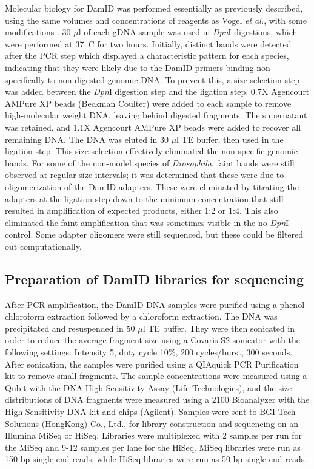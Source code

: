 Molecular biology for DamID was performed essentially as previously described, using the same volumes and concentrations of reagents as Vogel \emph{et al.}, with some modifications \citep{vogel_detection_2007}. 30 \(\mu\)l of each gDNA sample was used in \emph{Dpn}I digestions, which were performed at 37\degree~C for two hours. Initially, distinct bands were detected after the PCR step which displayed a characteristic pattern for each species, indicating that they were likely due to the DamID primers binding non-specifically to non-digested genomic DNA. To prevent this, a size-selection step was added between the \emph{Dpn}I digestion step and the ligation step. 0.7X Agencourt AMPure XP beads (Beckman Coulter) were added to each sample to remove high-molecular weight DNA, leaving behind digested fragments. The supernatant was retained, and 1.1X Agencourt AMPure XP beads were added to recover all remaining DNA. The DNA was eluted in 30 \(\mu\)l TE buffer, then used in the ligation step. This size-selection effectively eliminated the non-specific genomic bands. For some of the non-model species of \emph{Drosophila}, faint bands were still observed at regular size intervals; it was determined that these were due to oligomerization of the DamID adapters. These were eliminated by titrating the adapters at the ligation step down to the minimum concentration that still resulted in amplification of expected products, either 1:2 or 1:4. This also eliminated the faint amplification that was sometimes visible in the no-\emph{Dpn}I control. Some adapter oligomers were still sequenced, but these could be filtered out computationally.  

\subsection{Preparation of DamID libraries for sequencing}
After PCR amplification, the DamID DNA samples were purified using a phenol-chloroform extraction followed by a chloroform extraction. The DNA was precipitated and resuspended in 50 \(\mu\)l TE buffer. They were then sonicated in order to reduce the average fragment size using a Covaris S2 sonicator with the following settings: Intensity 5, duty cycle 10\%, 200 cycles/burst, 300 seconds. After sonication, the samples were purified using a QIAquick PCR Purification kit to remove small fragments. The sample concentrations were measured using a Qubit with the DNA High Sensitivity Assay (Life Technologies), and the size distributions of DNA fragments were measured using a 2100 Bioanalyzer with the High Sensitivity DNA kit and chips (Agilent). Samples were sent to BGI Tech Solutions (HongKong) Co., Ltd., for library construction and sequencing on an Illumina MiSeq or HiSeq. Libraries were multiplexed with 2 samples per run for the MiSeq and 9-12 samples per lane for the HiSeq. MiSeq libraries were run as 150-bp single-end reads, while HiSeq libraries were run as 50-bp single-end reads. 

